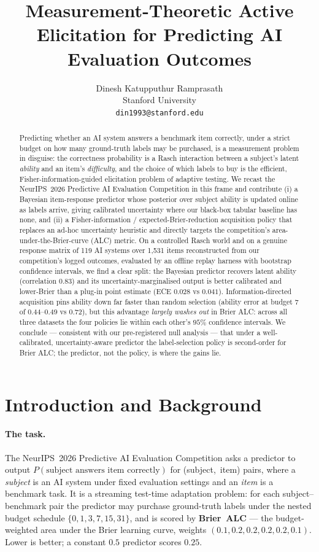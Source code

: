 \documentclass{article}
\title{Measurement-Theoretic Active Elicitation for Predicting AI
Evaluation Outcomes}
\author{%
  Dinesh Katupputhur Ramprasath \\
  Stanford University \\
  \texttt{din1993@stanford.edu} \\
}
\begin{document}
\maketitle

\begin{abstract}
Predicting whether an AI system answers a benchmark item correctly, under a
strict budget on how many ground-truth labels may be purchased, is a
measurement problem in disguise: the correctness probability is a Rasch
interaction between a subject's latent \emph{ability} and an item's
\emph{difficulty}, and the choice of which labels to buy is the efficient,
Fisher-information-guided elicitation problem of adaptive testing. We recast the
NeurIPS~2026 Predictive AI Evaluation Competition in this frame and contribute
(i) a Bayesian item-response predictor whose posterior over subject ability is
updated online as labels arrive, giving calibrated uncertainty where our
black-box tabular baseline has none, and (ii) a Fisher-information /
expected-Brier-reduction acquisition policy that replaces an ad-hoc uncertainty
heuristic and directly targets the competition's area-under-the-Brier-curve
(ALC) metric. On a controlled Rasch world and on a genuine response matrix of
119 AI systems over 1{,}531 items reconstructed from our competition's logged
outcomes, evaluated by an offline replay harness with bootstrap confidence
intervals, we find a clear split: the Bayesian predictor recovers latent ability (correlation $0.83$) and its uncertainty-marginalised
output is better calibrated and lower-Brier than a plug-in point estimate
(ECE $0.028$ vs $0.041$). Information-directed acquisition pins ability down far
faster than random selection (ability error at budget 7 of $0.44$--$0.49$ vs
$0.72$), but this advantage \emph{largely washes out} in Brier ALC: across all
three datasets the four policies lie within each other's $95\%$ confidence
intervals. We conclude --- consistent with our pre-registered null analysis ---
that under a well-calibrated, uncertainty-aware predictor the label-selection
policy is second-order for Brier ALC; the predictor, not the policy, is where
the gains lie.
\end{abstract}

\section{Introduction and Background}

\paragraph{The task.} The NeurIPS~2026 Predictive AI Evaluation Competition asks
a predictor to output $P(\text{subject answers item correctly})$ for
\mbox{(subject, item)} pairs, where a \emph{subject} is an AI system under fixed
evaluation settings and an \emph{item} is a benchmark task. It is a streaming
test-time adaptation problem: for each subject--benchmark pair the predictor may
purchase ground-truth labels under the nested budget schedule
$\{0,1,3,7,15,31\}$, and is scored by \textbf{Brier~ALC} --- the
budget-weighted area under the Brier learning curve, weights
$(0.1,0.2,0.2,0.2,0.2,0.1)$. Lower is better; a constant $0.5$ predictor scores
$0.25$.
\end{document}
